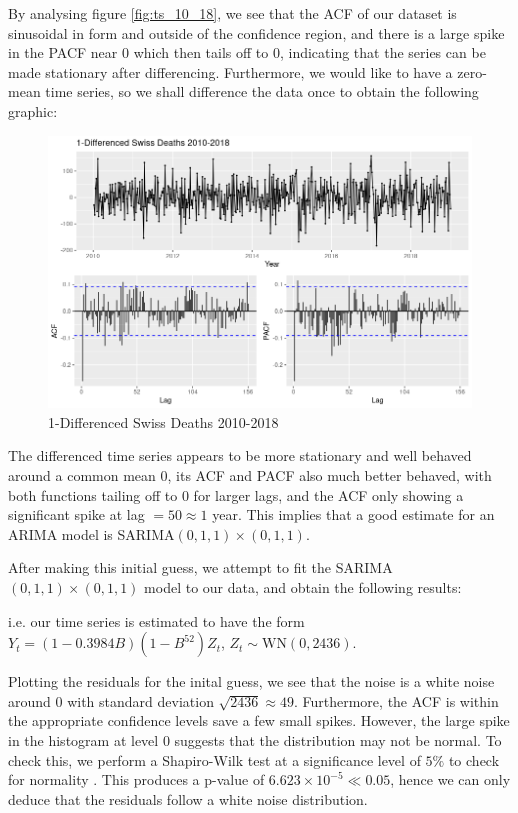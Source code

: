 \documentclass[a4paper, oneside]{discothesis}
\begin{document}
By analysing figure \ref{fig:ts_10_18}, we see that the ACF of our dataset is sinusoidal in form and outside of the confidence region, and there is a large spike in the PACF near 0 which then tails off to $0$, indicating that the series can be made stationary after differencing. Furthermore, we would like to have a zero-mean time series, so we shall difference the data once to obtain the following graphic:
\begin{figure}[H]
\centering
\includegraphics[width=.8\textwidth]{figures/ts_10_18_diff.png}
\caption{1-Differenced Swiss Deaths 2010-2018}
\end{figure}
\newpage
The differenced time series appears to be more stationary and well behaved around a common mean $0$, its ACF and PACF also much better behaved, with both functions tailing off to $0$ for larger lags, and the ACF only showing a significant spike at lag $=50\approx1$ year. This implies that a good estimate for an ARIMA model is SARIMA$(0,1,1)\times(0,1,1)$.

After making this initial guess, we attempt to fit the SARIMA$(0,1,1)\times(0,1,1)$ model to our data, and obtain the following results:


i.e. our time series is estimated to have the form $Y_t = (1 - 0.3984B)(1 - B^{52})Z_t$, $Z_t \sim \mathrm{WN}(0, 2436)$.

Plotting the residuals for the inital guess, we see that the noise is a white noise around $0$ with standard deviation $\sqrt{2436} \approx 49$. Furthermore, the ACF is within the appropriate confidence levels save a few small spikes. However, the large spike in the histogram at level $0$ suggests that the distribution may not be normal. To check this, we perform a Shapiro-Wilk test at a significance level of $5\%$ to check for normality \cite{shapirowilk}. This produces a p-value of $6.623\times 10^{-5} \ll 0.05$, hence we can only deduce that the residuals follow a white noise distribution.
\end{document}
